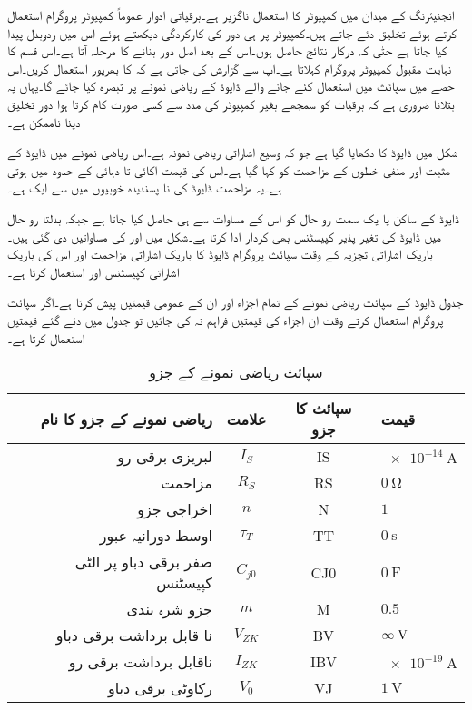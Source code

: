 انجنیئرنگ کے میدان میں کمپیوٹر کا استعمال ناگزیر ہے۔برقیاتی ادوار عموماً کمپیوٹر پروگرام استعمال کرتے ہوئے تخلیق دئے جاتے ہیں۔کمپیوٹر پر ہی دور کی کارکردگی دیکھتے ہوئے اس میں ردوبدل پیدا کیا جاتا ہے حتٰی کہ درکار نتائج حاصل ہوں۔اس کے بعد اصل دور بنانے کا مرحلہ آتا ہے۔اس قسم کا نہایت مقبول کمپیوٹر پروگرام   کہلاتا ہے۔آپ سے گزارش کی جاتی ہے کہ  کا بھرپور  استعمال کریں۔اس حصے میں سپائث میں استعمال کئے جانے والے ڈایوڈ کے ریاضی نمونے پر تبصرہ کیا جائے گا۔یہاں یہ بتلانا ضروری ہے کہ برقیات کو سمجھے بغیر کمپیوٹر کی مدد سے کسی صورت کام کرتا ہوا دور تخلیق دینا ناممکن ہے۔

شکل   میں ڈایوڈ کا  دکھایا گیا ہے جو کہ وسیع اشاراتی ریاضی نمونہ ہے۔اس ریاضی نمونے میں ڈایوڈ کے مثبت اور منفی خطوں کے مزاحمت کو  کہا گیا ہے۔اس کی قیمت اکائی تا دہائی کے حدود میں ہوتی ہے۔یہ مزاحمت ڈایوڈ کی نا پسندیدہ خوبیوں میں سے ایک ہے۔

ڈایوڈ کے ساکن یا یک سمت رو حال کو اس کے    مساوات سے ہی حاصل کیا جاتا ہے جبکہ بدلتا رو حال میں ڈایوڈ کی تغیر پذیر کپیسٹنس  بھی کردار ادا کرتا ہے۔شکل میں   اور  کی مساواتیں دی گئی ہیں۔باریک اشاراتی تجزیہ  کے وقت سپائث پروگرام ڈایوڈ کا باریک اشاراتی مزاحمت  اور اس کی باریک اشاراتی کپیسٹنس  اور  استعمال کرتا ہے۔

جدول   ڈایوڈ کے سپائث ریاضی نمونے کے تمام اجزاء اور ان کے عمومی قیمتیں پیش کرتا ہے۔اگر سپائث پروگرام استعمال کرتے وقت ان اجزاء کی قیمتیں فراہم نہ کی جائیں تو  جدول  میں دئے گئے قیمتیں استعمال کرتا ہے۔
\begin{table}
\caption{سپائث ریاضی نمونے کے جزو}
\label{جدول_سپائث_ماڈل_کے_جزو}
\centering
\begin{tabular}[htp]{r c c l}
\toprule
ریاضی نمونے کے جزو کا نام & علامت & سپائث کا جزو & قیمت \\
\midrule
لبریزی برقی رو   & $ I_S $    & IS & $\SI{e-14}{\ampere}$\\
مزاحمت & $R_S$  & RS & $\SI{0}{\ohm}$ \\
اخراجی جزو & $n$ & N & $1$ \\
اوسط دورانیہ عبور & $\tau_T$ & TT & $\SI{0}{\second}$\\
صفر برقی دباو پر الٹی کپیسٹنس & $C_{j0}$ & CJ0 & $\SI{0}{\farad}$\\
جزو شرہ بندی & $m$ & M & $0.5$\\
نا قابل برداشت برقی دباو &  $V_{ZK}$ & BV & $\infty \hspace{1mm} \si{\volt}$\\
ناقابل برداشت برقی رو & $I_{ZK}$ & IBV & $\SI{e-19}{\ampere}$\\
رکاوٹی برقی دباو & $V_0$ & VJ & $\SI{1}{\volt}$ \\
\bottomrule
\end{tabular}
\end{table}
%

